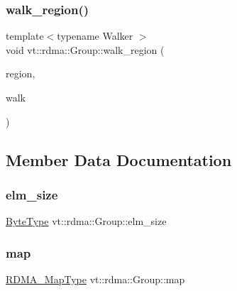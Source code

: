 \subsubsection{\texorpdfstring{walk\+\_\+region()}{walk\_region()}}
{\footnotesize\ttfamily template$<$typename Walker $>$ \\
void vt\+::rdma\+::\+Group\+::walk\+\_\+region (\begin{DoxyParamCaption}\item[{\hyperlink{structvt_1_1rdma_1_1_group_a245644a7a0c40c547728a74e69c5e02f}{R\+D\+M\+A\+\_\+\+Region\+Type} const \&}]{region,  }\item[{Walker \&\&}]{walk }\end{DoxyParamCaption})\hspace{0.3cm}{\ttfamily [inline]}}



\subsection{Member Data Documentation}
\mbox{\label{structvt_1_1rdma_1_1_group_a99d69c11abeba7369b05fd97fe339551}} 
\subsubsection{\texorpdfstring{elm\+\_\+size}{elm\_size}}
{\footnotesize\ttfamily \hyperlink{namespacevt_aab8d55968084610ce3b17057981e9300}{Byte\+Type} vt\+::rdma\+::\+Group\+::elm\+\_\+size}

\mbox{\label{structvt_1_1rdma_1_1_group_ab2d2df3f8a32c3230210ab7ce74c0e4e}} 
\subsubsection{\texorpdfstring{map}{map}}
{\footnotesize\ttfamily \hyperlink{structvt_1_1rdma_1_1_group_a6a953be1b6d9907d49364a9a202d3379}{R\+D\+M\+A\+\_\+\+Map\+Type} vt\+::rdma\+::\+Group\+::map}

\mbox{\label{structvt_1_1rdma_1_1_group_aa796cf358db135c28675c3843d839e4b}} 

